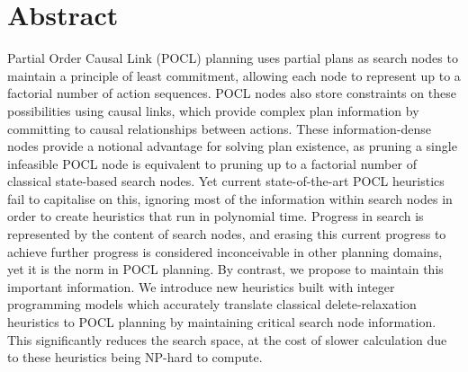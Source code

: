 \chapter*{Abstract}

Partial Order Causal Link (POCL) planning uses partial plans as search nodes to maintain a principle of least commitment, allowing each node to represent up to a factorial number of action sequences. POCL nodes also store constraints on these possibilities using causal links, which provide complex plan information by committing to causal relationships between actions. These information-dense nodes provide a notional advantage for solving plan existence, as pruning a single infeasible POCL node is equivalent to pruning up to a factorial number of classical state-based search nodes. Yet current state-of-the-art POCL heuristics fail to capitalise on this, ignoring most of the information within search nodes in order to create heuristics that run in polynomial time. Progress in search is represented by the content of search nodes, and erasing this current progress to achieve further progress is considered inconceivable in other planning domains, yet it is the norm in POCL planning. By contrast, we propose to maintain this important information. We introduce new heuristics built with integer programming models which accurately translate classical delete-relaxation heuristics to POCL planning by maintaining critical search node information. This significantly reduces the search space, at the cost of slower calculation due to these heuristics being NP-hard to compute.